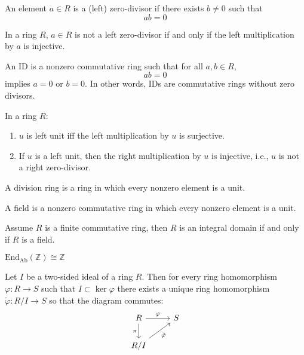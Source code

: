 \documentclass[openany]{book}
\newcommand{\Z}{\mathbb{Z}}
\begin{document}
\begin{defn}
    An element $a\in R$ is a (left) zero-divisor if there exists $b\neq 0$ such that 
    \begin{equation*}
        ab=0
    \end{equation*}
\end{defn}

\begin{prop}
    In a ring $R$, $a\in R$ is not a left zero-divisor if and only if the left multiplication by $a$ is injective.
\end{prop}

\begin{defn}
    An ID is a nonzero commutative ring such that for all $a,b\in R$, 
    \begin{equation*}
        ab=0
    \end{equation*}
    implies $a=0$ or $b=0$. In other words, IDs are commutative rings without zero divisors.
\end{defn}

\begin{prop}
    In a ring $R$:
    \begin{enumerate}
        \item $u$ is left unit iff the left multiplication by $u$ is surjective. 
        \item If $u$ is a left unit, then the right multiplication by $u$ is injective, i.e., $u$ is not a right zero-divisor.
    \end{enumerate}
\end{prop}

\begin{defn}
    A division ring is a ring in which every nonzero element is a unit.

    A field is a nonzero commutative ring in which every nonzero element is a unit.
\end{defn}


\begin{prop}
    Assume $R$ is a finite commutative ring, then $R$ is an integral domain if and only if $R$ is a field.
\end{prop}

\begin{prop}
    $\text{End}_{\text{Ab}}(\Z)\cong\Z$
\end{prop}



\begin{thm}
    Let $I$ be a two-sided ideal of a ring $R$. Then for every ring homomorphism $\varphi: R\to S$ such that $I\subset\ker\varphi$ there exists a unique ring homomorphism $\tilde{\varphi}: R/I\to S$ so that the diagram commutes:
    \[\begin{tikzcd}
        R & S \\
        {R/I}
        \arrow["\varphi", from=1-1, to=1-2]
        \arrow["\pi"', from=1-1, to=2-1]
        \arrow["{\tilde{\varphi}}"', from=2-1, to=1-2]
    \end{tikzcd}\]
\end{thm}
\end{document}

